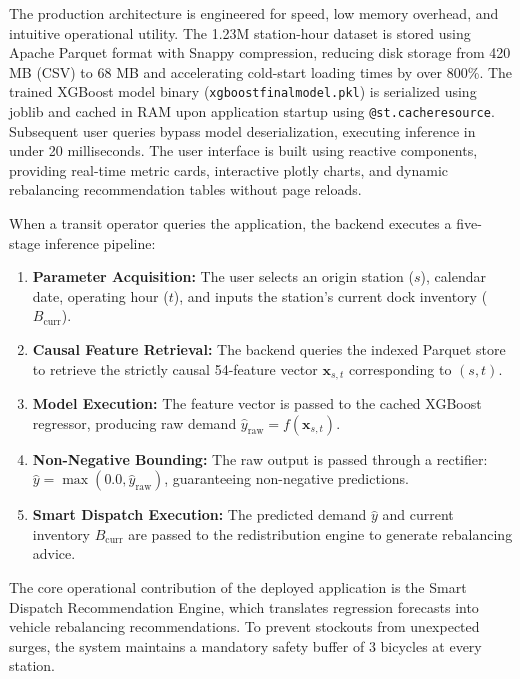 \documentclass[12pt, a4paper]{article}
\renewcommand{\_}{\textunderscore\allowbreak}
\begin{document}
The production architecture is engineered for speed, low memory overhead, and intuitive operational utility. The 1.23M station-hour dataset is stored using Apache Parquet format with Snappy compression, reducing disk storage from 420 MB (CSV) to 68 MB and accelerating cold-start loading times by over 800\%. The trained XGBoost model binary (\texttt{xgboost\_final\_model.pkl}) is serialized using joblib and cached in RAM upon application startup using \texttt{@st.cache\_resource}. Subsequent user queries bypass model deserialization, executing inference in under 20 milliseconds. The user interface is built using reactive components, providing real-time metric cards, interactive plotly charts, and dynamic rebalancing recommendation tables without page reloads.

When a transit operator queries the application, the backend executes a five-stage inference pipeline:
\begin{enumerate}
    \item \textbf{Parameter Acquisition:} The user selects an origin station ($s$), calendar date, operating hour ($t$), and inputs the station's current dock inventory ($B_{\text{curr}}$).
    \item \textbf{Causal Feature Retrieval:} The backend queries the indexed Parquet store to retrieve the strictly causal 54-feature vector $\mathbf{x}_{s, t}$ corresponding to $(s, t)$.
    \item \textbf{Model Execution:} The feature vector is passed to the cached XGBoost regressor, producing raw demand $\hat{y}_{\text{raw}} = f(\mathbf{x}_{s, t})$.
    \item \textbf{Non-Negative Bounding:} The raw output is passed through a rectifier: $\hat{y} = \max(0.0, \hat{y}_{\text{raw}})$, guaranteeing non-negative predictions.
    \item \textbf{Smart Dispatch Execution:} The predicted demand $\hat{y}$ and current inventory $B_{\text{curr}}$ are passed to the redistribution engine to generate rebalancing advice.
\end{enumerate}

The core operational contribution of the deployed application is the Smart Dispatch Recommendation Engine, which translates regression forecasts into vehicle rebalancing recommendations. To prevent stockouts from unexpected surges, the system maintains a mandatory safety buffer of 3 bicycles at every station.
\end{document}
